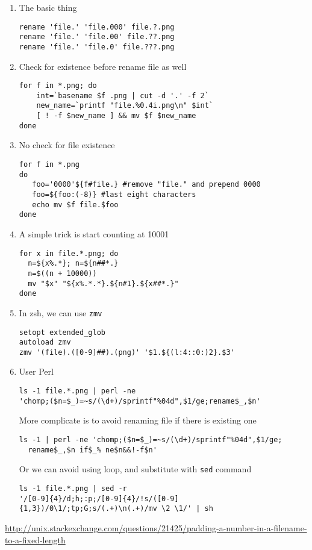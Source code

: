 \begin{enumerate}
  
  \item The basic thing
\begin{verbatim}
rename 'file.' 'file.000' file.?.png
rename 'file.' 'file.00' file.??.png
rename 'file.' 'file.0' file.???.png
\end{verbatim}

  \item Check for existence before rename file as well 
\begin{verbatim}
for f in *.png; do
    int=`basename $f .png | cut -d '.' -f 2`
    new_name=`printf "file.%0.4i.png\n" $int`
    [ ! -f $new_name ] && mv $f $new_name
done
\end{verbatim}

  \item No check for file existence
\begin{verbatim}
for f in *.png
do
   foo='0000'${f#file.} #remove "file." and prepend 0000
   foo=${foo:(-8)} #last eight characters
   echo mv $f file.$foo   
done
\end{verbatim}

  \item A simple trick is start counting at 10001 
\begin{verbatim}
for x in file.*.png; do
  n=${x%.*}; n=${n##*.}
  n=$((n + 10000))
  mv "$x" "${x%.*.*}.${n#1}.${x##*.}"
done
\end{verbatim}

 \item In zsh, we can use \verb!zmv!
\begin{verbatim}
setopt extended_glob
autoload zmv
zmv '(file).([0-9]##).(png)' '$1.${(l:4::0:)2}.$3'
\end{verbatim}

  \item User Perl
\begin{verbatim}
ls -1 file.*.png | perl -ne
'chomp;($n=$_)=~s/(\d+)/sprintf"%04d",$1/ge;rename$_,$n'
\end{verbatim}

More complicate is to avoid renaming file if there is existing one
\begin{verbatim}
ls -1 | perl -ne 'chomp;($n=$_)=~s/(\d+)/sprintf"%04d",$1/ge;
  rename$_,$n if$_% ne$n&&!-f$n'
\end{verbatim}

Or we can avoid using loop, and substitute with \verb!sed! command
\begin{verbatim}
ls -1 file.*.png | sed -r
'/[0-9]{4}/d;h;:p;/[0-9]{4}/!s/([0-9]{1,3})/0\1/;tp;G;s/(.+)\n(.+)/mv \2 \1/' | sh
\end{verbatim}
\end{enumerate}
\url{http://unix.stackexchange.com/questions/21425/padding-a-number-in-a-filename-to-a-fixed-length}
